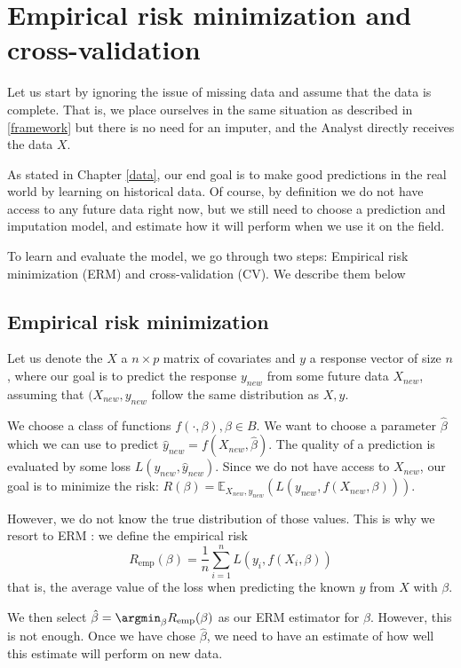 	\section{Empirical risk minimization and cross-validation}
	\label{ERM}
Let us start by ignoring the issue of missing data and assume that the data is complete. That is, we place ourselves in the same situation as described in \ref{framework} but there is no need for an imputer, and the Analyst directly receives the data $X$.
	
As stated in Chapter \ref{data}, our end goal is to make good predictions in the real world by learning on historical data. Of course, by definition we do not have access to any future data right now, but we still need to choose a prediction and imputation model, and estimate how it will perform when we use it on the field. 

To learn and evaluate the model, we go through two steps: Empirical risk minimization (ERM) and cross-validation (CV). We describe them below
		\subsection{Empirical risk minimization}
Let us denote the $X$ a $n \times p$ matrix of covariates and $y$ a response vector of size $n$, where our goal is to predict the response $y_{new}$ from some future data $X_{new}$, assuming that $(X_{new}, y_{new}$ follow the same distribution as $X,y$. 

We choose a class of functions $f(\cdot, \beta), \beta \in B$. We want to choose a parameter $\hat{\beta}$ which we can use to predict $\hat{y}_{new} = f(X_{new}, \hat{\beta})$.  The quality of a prediction is evaluated by some loss $L(y_{new},\hat{y}_{new})$. Since we do not have access to $X_{new}$, our goal is to minimize the risk: $R(\beta) = \mathbb{E}_{X_{new},y_{new}}(L(y_{new}, f(X_{new}, \beta)))$.

However, we do not know the true distribution of those values. This is why we resort to ERM \cite{ERM}: we define the empirical risk
$$ R_{\text{emp}}(\beta) = \frac{1}{n} \sum\limits_{i=1}^n L(y_i, f(X_i, \beta))$$
that is, the average value of the loss when predicting the known $y$  from $X$ with $\beta$.

We then select $\hat{\beta} = \argmin_{\beta} R_{\text{emp}}(\beta)$ as our ERM estimator for $\beta$. However, this is not enough. Once we have chose $\hat{\beta}$, we need to have an estimate of how well this estimate will perform on new data.

